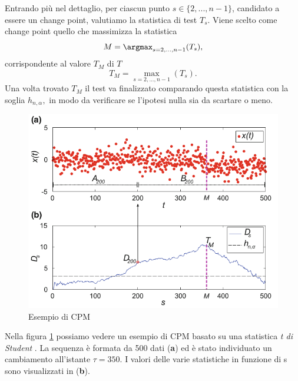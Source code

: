 			Entrando pi\`u nel dettaglio, per ciascun
                        punto $ s \in \{2,...,n-1\} $, candidato a
                        essere un change point, valutiamo la
                        statistica di test $ T_s. $ Viene scelto come
                        change point quello che massimizza la
                        statistica
			\[ M= \argmax_{s=2,...,n-1} (T_s), \]
                        corrispondente al valore $ T_M $ di $T$
                        \[ T_M = \max_{s=2,...,n-1} (T_s).\]
                        Una volta trovato $T_M$ il test va finalizzato
                        comparando questa statistica con la soglia
                        $ h_{n,\alpha}, $ in modo da verificare se
                        l'ipotesi nulla sia da scartare o meno.
			 
			 \begin{figure}
                           \centering
                           \includegraphics[width=12cm,keepaspectratio]{pictures/CPM}
                           \caption{Esempio di CPM}
                           \label{fig:CPM}
                         \end{figure}
			
                         Nella figura \ref{fig:CPM} possiamo vedere un esempio di CPM basato su una statistica \textit{t di Student} \cite{alippi2014intelligence}. La sequenza \`e formata da 500 dati (\textbf{a}) ed \`e stato individuato un cambiamento all'istante $\tau=350$. I valori delle varie statistiche in funzione di s sono visualizzati in (\textbf{b}).\\
			
